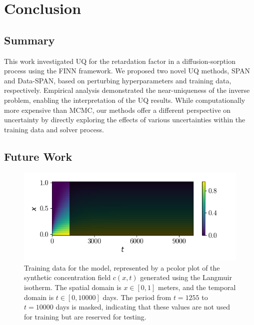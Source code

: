 \section{Conclusion}
\subsection{Summary}
This work investigated UQ for the retardation factor in a diffusion-sorption process using the FINN framework. We proposed two novel UQ methods, SPAN and Data-SPAN, based on perturbing hyperparameters and training data, respectively. Empirical analysis demonstrated the near-uniqueness of the inverse problem, enabling the interpretation of the UQ results. While computationally more expensive than MCMC, our methods offer a different perspective on uncertainty by directly exploring the effects of various uncertainties within the training data and solver process.

\subsection{Future Work}






\begin{figure}[h]
    \centering
    \includegraphics{figs/c_diss_field_full_black_test.png}
    \caption{Training data for the model, represented by a pcolor plot of the synthetic concentration field $c(x,t)$ generated using the Langmuir isotherm. The spatial domain is $x \in [0, 1]$ meters, and the temporal domain is $t \in [0, 10000]$ days. The period from $t = 1255$ to $t = 10000$ days is masked, indicating that these values are not used for training but are reserved for testing.}
    \label{fig:c_diss_field_full_black_test}
\end{figure}